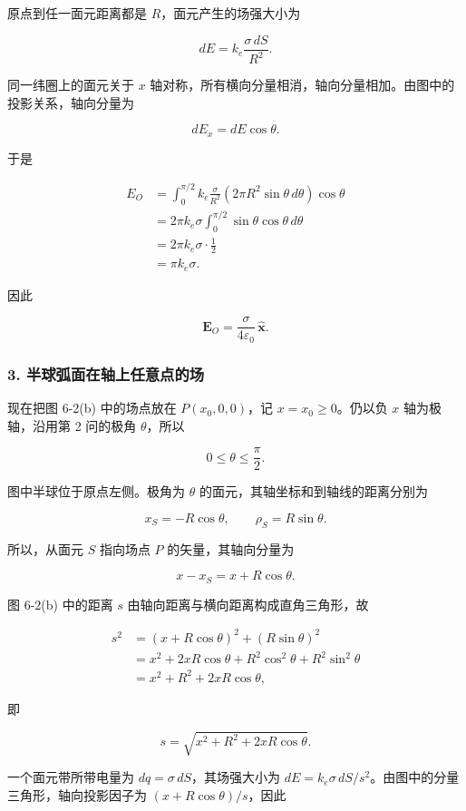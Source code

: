 \documentclass[12pt,a4paper,UTF8]{ctexart}
\begin{document}
原点到任一面元距离都是 \(R\)，面元产生的场强大小为

\[
dE=k_e\frac{\sigma\,dS}{R^2}.
\]

同一纬圈上的面元关于 \(x\)
轴对称，所有横向分量相消，轴向分量相加。由图中的投影关系，轴向分量为

\[
dE_x=dE\cos\theta.
\]

于是

\[
\begin{aligned}
E_O
&=\int_0^{\pi/2}k_e\frac{\sigma}{R^2}
\left(2\pi R^2\sin\theta\,d\theta\right)\cos\theta\\
&=2\pi k_e\sigma\int_0^{\pi/2}\sin\theta\cos\theta\,d\theta\\
&=2\pi k_e\sigma\cdot\frac12\\
&=\pi k_e\sigma.
\end{aligned}
\]

因此

\[
\boxed{
\bm E_O=\frac{\sigma}{4\varepsilon_0}\,\hat{\bm x}
}.
\]

\subsubsection{3.
半球弧面在轴上任意点的场}\label{ux534aux7403ux5f27ux9762ux5728ux8f74ux4e0aux4efbux610fux70b9ux7684ux573a}

现在把图 6-2(b) 中的场点放在 \(P(x_0,0,0)\)，记 \(x=x_0\ge0\)。仍以负
\(x\) 轴为极轴，沿用第 2 问的极角 \(\theta\)，所以

\[
0\le\theta\le\frac{\pi}{2}.
\]

图中半球位于原点左侧。极角为 \(\theta\)
的面元，其轴坐标和到轴线的距离分别为

\[
x_S=-R\cos\theta,
\qquad
\rho_S=R\sin\theta.
\]

所以，从面元 \(S\) 指向场点 \(P\) 的矢量，其轴向分量为

\[
x-x_S=x+R\cos\theta.
\]

图 6-2(b) 中的距离 \(s\) 由轴向距离与横向距离构成直角三角形，故

\[
\begin{aligned}
s^2
&=(x+R\cos\theta)^2+(R\sin\theta)^2\\
&=x^2+2xR\cos\theta+R^2\cos^2\theta+R^2\sin^2\theta\\
&=x^2+R^2+2xR\cos\theta,
\end{aligned}
\]

即

\[
s=\sqrt{x^2+R^2+2xR\cos\theta}.
\]

一个面元带所带电量为 \(dq=\sigma\,dS\)，其场强大小为
\(dE=k_e\sigma\,dS/s^2\)。由图中的分量三角形，轴向投影因子为
\((x+R\cos\theta)/s\)，因此
\end{document}
